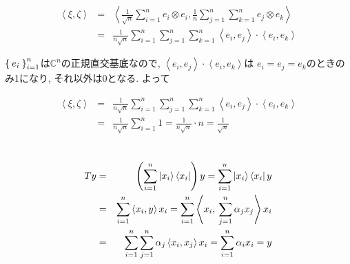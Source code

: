 \documentclass[a4paper,11pt]{jsarticle}
\begin{document}
\section{}
\begin{eqnarray*}
  \left<\xi, \zeta\right> &=& \left<
    \frac{1}{\sqrt{n}}\sum_{i=1}^{n}e_i \otimes e_i,
    \frac{1}{n}\sum_{j=1}^{n}\sum_{k=1}^{n}e_j \otimes e_k
  \right> \\
  &=& \frac{1}{n\sqrt{n}}\sum_{i=1}^n\sum_{j=1}^n\sum_{k=1}^n
  \left<e_i, e_j\right> \cdot \left<e_i, e_k\right>
\end{eqnarray*}

$\Set{e_i}_{i=1}^n$は$\mathbb{C}^n$の正規直交基底なので, 
$\left<e_i, e_j\right> \cdot \left<e_i, e_k\right>$は
$e_i = e_j = e_k$のときのみ1になり, それ以外は0となる.
よって

\begin{eqnarray*}
  \left<\xi, \zeta\right>
  &=& \frac{1}{n\sqrt{n}}\sum_{i=1}^n\sum_{j=1}^n\sum_{k=1}^n
    \left<e_i, e_j\right> \cdot \left<e_i, e_k\right> \\
  &=& \frac{1}{n\sqrt{n}}\sum_{i=1}^{n}{1}
    = \frac{1}{n\sqrt{n}} \cdot n = \frac{1}{\sqrt{n}}
\end{eqnarray*}

\section{}
\begin{eqnarray*}
  Ty &=& \left(\sum_{i=1}^n\Ket{x_i}\Bra{x_i}\right)y
    = \sum_{i=1}^n\Ket{x_i}\Bra{x_i}y \\
  &=& \sum_{i=1}^n\left<x_i, y\right>x_i
    = \sum_{i=1}^n\left<x_i, \hspace{2pt}\sum_{j=1}^n\alpha_j x_j\right>x_i \\
  &=& \sum_{i=1}^n\sum_{j=1}^n\alpha_j\left<x_i, x_j\right>x_i
    = \sum_{i=1}^n\alpha_ix_i = y
\end{eqnarray*}
\end{document}
